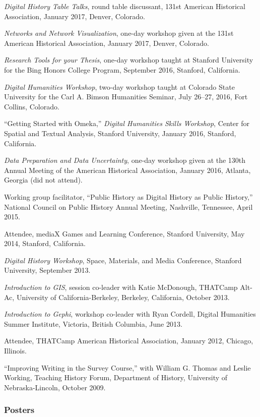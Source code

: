 \emph{Digital History Table Talks}, round table discussant, 131st
American Historical Association, January 2017, Denver, Colorado.

\emph{Networks and Network Visualization}, one-day workshop given at the
131st American Historical Association, January 2017, Denver, Colorado.

\emph{Research Tools for your Thesis}, one-day workshop taught at
Stanford University for the Bing Honors College Program, September 2016,
Stanford, California.

\emph{Digital Humanities Workshop}, two-day workshop taught at Colorado
State University for the Carl A. Bimson Humanities Seminar, July 26--27,
2016, Fort Collins, Colorado.

``Getting Started with Omeka,'' \emph{Digital Humanities Skills
Workshop}, Center for Spatial and Textual Analysis, Stanford University,
January 2016, Stanford, California.

\emph{Data Preparation and Data Uncertainty}, one-day workshop given at
the 130th Annual Meeting of the American Historical Association, January
2016, Atlanta, Georgia (did not attend).

Working group facilitator, ``Public History as Digital History as Public
History,'' National Council on Public History Annual Meeting, Nashville,
Tennessee, April 2015.

Attendee, mediaX Games and Learning Conference, Stanford University, May
2014, Stanford, California.

\emph{Digital History Workshop}, Space, Materials, and Media Conference,
Stanford University, September 2013.

\emph{Introduction to GIS}, session co-leader with Katie McDonough,
THATCamp Alt-Ac, University of California-Berkeley, Berkeley,
California, October 2013.

\emph{Introduction to Gephi}, workshop co-leader with Ryan Cordell,
Digital Humanities Summer Institute, Victoria, British Columbia, June
2013.

Attendee, THATCamp American Historical Association, January 2012,
Chicago, Illinois.

``Improving Writing in the Survey Course,'' with William G. Thomas and
Leslie Working, Teaching History Forum, Department of History,
University of Nebraska-Lincoln, October 2009.

\subsubsection{Posters}\label{posters}

